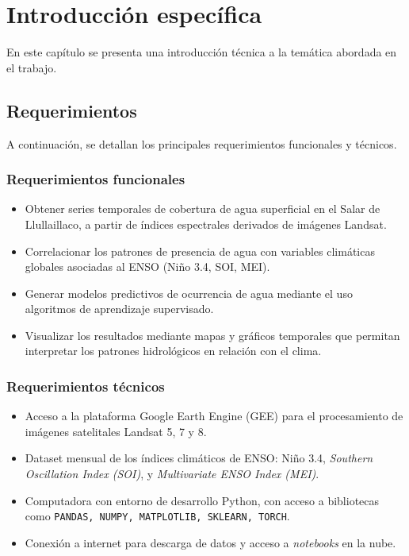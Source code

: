 \chapter{Introducción específica} %

\label{Chapter2}

En este capítulo se presenta una introducción técnica a la temática abordada en el trabajo. 

\section{Requerimientos}
\label{sec:ejemplo}
A continuación, se detallan los principales requerimientos funcionales y técnicos.

\subsection*{Requerimientos funcionales}

\begin{itemize}
\item Obtener series temporales de cobertura de agua superficial en el Salar de Llullaillaco, a partir de índices espectrales derivados de imágenes Landsat.
\item Correlacionar los patrones de presencia de agua con variables climáticas globales asociadas al ENSO (Niño 3.4, SOI, MEI).
\item Generar modelos predictivos de ocurrencia de agua mediante el uso algoritmos de aprendizaje supervisado.
\item Visualizar los resultados mediante mapas y gráficos temporales que permitan interpretar los patrones hidrológicos en relación con el clima.
\end{itemize}

\subsection*{Requerimientos técnicos}

\begin{itemize}
\item Acceso a la plataforma Google Earth Engine (GEE) para el procesamiento de imágenes satelitales Landsat 5, 7 y 8.
\item Dataset mensual de los índices climáticos de ENSO: Niño 3.4, \textit{Southern Oscillation Index (SOI)}, y \textit{Multivariate ENSO Index (MEI)}.
\item Computadora con entorno de desarrollo Python, con acceso a bibliotecas como \texttt{PANDAS, NUMPY, MATPLOTLIB, SKLEARN, TORCH}.
\item Conexión a internet para descarga de datos y acceso a \textit{notebooks} en la nube.
\end{itemize}



